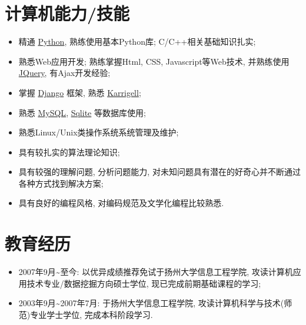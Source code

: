 \documentclass[a4paper,10pt,english]{manual}
\begin{document}
\section{计算机能力/技能}
\begin{itemize}
\item {} 
精通 \href{http://www.python.org/}{Python}, 熟练使用基本Python库; C/C++相关基础知识扎实;

\item {} 
熟悉Web应用开发; 熟练掌握Html, CSS, Javascript等Web技术, 并熟练使用 \href{http://jquery.com}{JQuery}, 有Ajax开发经验;

\item {} 
掌握 \href{http://www.djangoproject.com/}{Django} 框架, 熟悉 \href{http://karrigell.sourceforge.net/}{Karrigell};

\item {} 
熟悉 \href{http://www.mysql.com}{MySQL}, \href{http://www.sqlite.org}{Sqlite} 等数据库使用;

\item {} 
熟悉Linux/Unix类操作系统系统管理及维护;

\item {} 
具有较扎实的算法理论知识;

\item {} 
具有较强的理解问题, 分析问题能力, 对未知问题具有潜在的好奇心并不断通过各种方式找到解决方案;

\item {} 
具有良好的编程风格, 对编码规范及文学化编程比较熟悉.

\end{itemize}


\section{教育经历}
\begin{itemize}
\item {} 
2007年9月\textasciitilde{}至今: 以优异成绩推荐免试于扬州大学信息工程学院, 攻读计算机应用技术专业/数据挖掘方向硕士学位, 现已完成前期基础课程的学习;

\item {} 
2003年9月\textasciitilde{}2007年7月: 于扬州大学信息工程学院, 攻读计算机科学与技术(师范)专业学士学位, 完成本科阶段学习.

\end{itemize}
\end{document}
